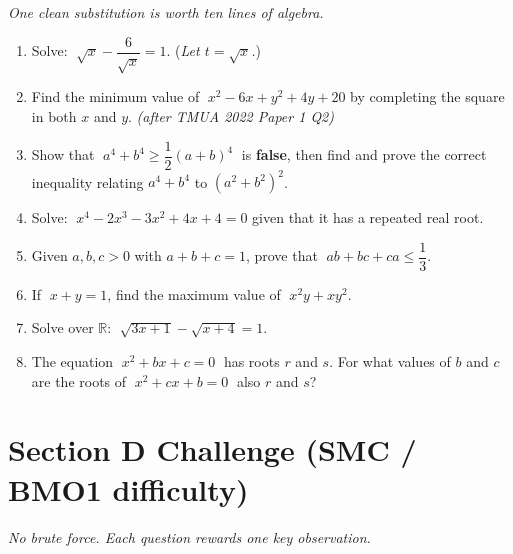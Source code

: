 \documentclass[11pt,a4paper]{article}
\begin{document}
\noindent\textit{One clean substitution is worth ten lines of algebra.}

\begin{enumerate}

\item Solve: $\;\sqrt{x} - \dfrac{6}{\sqrt{x}} = 1$.
      (\textit{Let $t = \sqrt{x}$.})

\item Find the minimum value of $\;x^2 - 6x + y^2 + 4y + 20$
      by completing the square in both $x$ and $y$. \textit{\small(after TMUA 2022 Paper 1 Q2)}

\item Show that $\;a^4 + b^4 \geq \dfrac{1}{2}(a+b)^4\;$ is \textbf{false},
      then find and prove the correct inequality relating $a^4+b^4$ to $(a^2+b^2)^2$.

\item Solve: $\;x^4 - 2x^3 - 3x^2 + 4x + 4 = 0$
      given that it has a repeated real root.

\item Given $a, b, c > 0$ with $a + b + c = 1$,
      prove that $\;ab + bc + ca \leq \dfrac{1}{3}$.

\item If $\;x + y = 1$, find the maximum value of $\;x^2 y + xy^2$.

\item Solve over $\mathbb{R}$: $\;\sqrt{3x+1} - \sqrt{x+4} = 1$.

\item The equation $\;x^2 + bx + c = 0\;$ has roots $r$ and $s$.
      For what values of $b$ and $c$ are the roots of
      $\;x^2 + cx + b = 0\;$ also $r$ and $s$?

\end{enumerate}

\section*{Section D \quad Challenge \hfill{\normalfont\small(SMC / BMO1 difficulty)}}

\noindent\textit{No brute force. Each question rewards one key observation.}
\end{document}
